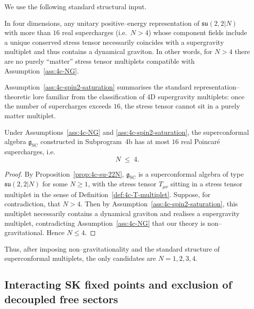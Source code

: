 We use the following standard structural input.

\begin{assumption}
\label{ass:4c-spin2-saturation}
In four dimensions, any unitary positive–energy representation of
\(\mathfrak{su}(2,2|N)\) with more than \(16\) real supercharges
(i.e.\ \(N>4\)) whose component fields include a unique conserved
stress tensor necessarily coincides with a supergravity multiplet and
thus contains a dynamical graviton.  In other words, for \(N>4\) there
are no purely ``matter'' stress tensor multiplets compatible with
Assumption~\ref{ass:4c-NG}.
\end{assumption}

Assumption~\ref{ass:4c-spin2-saturation} summarises the standard
representation–theoretic lore familiar from the classification of 4D
supergravity multiplets: once the number of supercharges exceeds \(16\),
the stress tensor cannot sit in a purely matter multiplet.

\begin{lemma}
\label{lem:4c-Nle4}
Under Assumptions~\ref{ass:4c-NG} and
\ref{ass:4c-spin2-saturation}, the superconformal algebra
\(\mathfrak g_{\mathrm{SC}}\) constructed in Subprogram~4b has at most
\(16\) real Poincaré supercharges, i.e.
\begin{equation}
  N\;\le\;4.
\end{equation}
\end{lemma}

\begin{proof}
By Proposition~\ref{prop:4c-su-22N}, \(\mathfrak g_{\mathrm{SC}}\) is a
superconformal algebra of type \(\mathfrak{su}(2,2|N)\) for some
\(N\ge1\), with the
stress tensor \(T_{\mu\nu}\) sitting in a stress tensor multiplet in the
sense of Definition~\ref{def:4c-T-multiplet}.  Suppose, for contradiction,
that \(N>4\).  Then by Assumption~\ref{ass:4c-spin2-saturation}, this
multiplet necessarily contains a dynamical graviton and realises a
supergravity multiplet, contradicting Assumption~\ref{ass:4c-NG} that
our theory is non–gravitational.  Hence \(N\le4\).
\end{proof}

Thus, after imposing non–gravitationality and the standard structure of
superconformal multiplets, the only candidates are \(N=1,2,3,4\).

\subsection{Interacting SK fixed points and exclusion of decoupled free sectors}
\label{subsec:4c-interacting}


